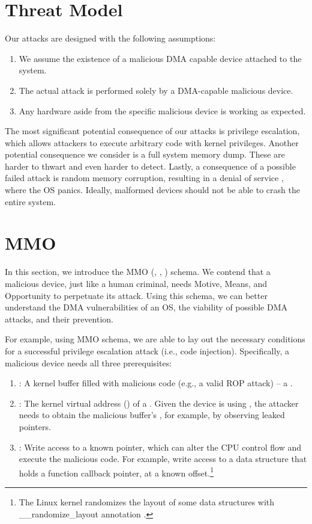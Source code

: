 

\section{Threat Model}\label{sec:threat_model}

Our attacks are designed with the following assumptions:
\begin{enumerate}
    \item We assume the existence of a malicious DMA capable device attached to the system.
    \item The actual attack is performed solely by a DMA-capable malicious device.
    \item Any hardware aside from the specific malicious device is working as expected.
 \end{enumerate}

The most significant potential consequence of our attacks is privilege escalation, which allows attackers to execute arbitrary code with kernel privileges. Another potential consequence we consider is a full system memory dump. These are harder to thwart and even harder to detect. Lastly, a consequence of a possible failed attack is random memory corruption, resulting in a denial of service \cite{MMT16}, where the OS panics. Ideally, malformed devices should not be able to crash the entire system. 

\section{MMO}\label{sec:mmo}

In this section, we introduce the MMO (\motivation, \means, \oportunity) schema. We contend that a malicious device, just like a human criminal, needs Motive, Means, and Opportunity to perpetuate its attack. Using this schema, we can better understand the DMA vulnerabilities of an OS, the viability of possible DMA attacks, and their prevention. 

For example, using MMO schema, we are able to lay out the necessary conditions for a successful privilege escalation attack (i.e., code injection). Specifically, a malicious device needs all three prerequisites:
\begin{enumerate}
    \item \motivation: A kernel buffer filled with malicious code (e.g., a valid ROP attack) -- a \mabaf.
    \item \means: The kernel virtual address (\kva) of a \mabaf. Given the device is using \iova, the attacker needs to obtain the malicious buffer's \kva{}, for example, by observing leaked pointers. 
    \item \oportunity: Write access to a known pointer, which can alter the CPU control flow and execute the malicious code. For example, write access to a data structure that holds a function callback pointer, at a known offset.\footnote{The Linux kernel randomizes the layout of some data structures with \_\_randomize\_layout annotation \cite{rand_layout}.}
\end{enumerate}


